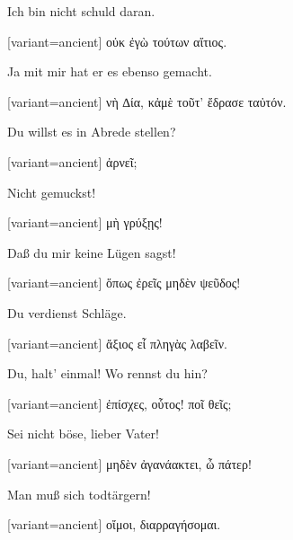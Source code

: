Ich bin nicht schuld daran.

\switchcolumn

\begin{greek}[variant=ancient]%
οὐκ ἐγὼ τούτων αἴτιος.

\end{greek}%
\switchcolumn*

Ja mit mir hat er es ebenso gemacht.

\switchcolumn

\begin{greek}[variant=ancient]%
νὴ ∆ία, κἀμὲ τοῦτ’ ἔδρασε ταὐτόν.

\end{greek}%
\switchcolumn*

Du willst es in Abrede stellen?

\switchcolumn

\begin{greek}[variant=ancient]%
ἀρνεῖ;

\end{greek}%
\switchcolumn*

Nicht gemuckst!

\switchcolumn

\begin{greek}[variant=ancient]%
μὴ γρύξῃς!

\end{greek}%
\switchcolumn*

Daß du mir keine Lügen sagst!

\switchcolumn

\begin{greek}[variant=ancient]%
ὅπως ἐρεῖς μηδὲν ψεῦδος!

\end{greek}%
\switchcolumn*

Du verdienst Schläge.

\switchcolumn

\begin{greek}[variant=ancient]%
ἄξιος εἶ πληγὰς λαβεῖν.

\end{greek}%
\switchcolumn*

Du, halt' einmal! Wo rennst du hin?

\switchcolumn

\begin{greek}[variant=ancient]%
ἐπίσχες, οὗτος! ποῖ θεῖς;

\end{greek}%
\switchcolumn*

Sei nicht böse, lieber Vater!

\switchcolumn

\begin{greek}[variant=ancient]%
μηδὲν ἀγανάακτει, ὦ πάτερ!

\end{greek}%
\switchcolumn*

Man muß sich todtärgern!

\switchcolumn

\begin{greek}[variant=ancient]%
οἴμοι, διαρραγήσομαι.

\end{greek}%
